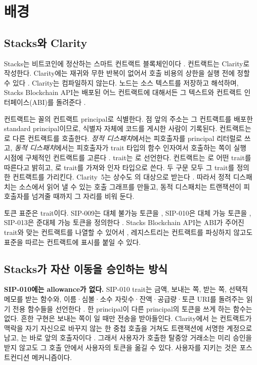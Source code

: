 \section{배경}
\label{sec:background}

\subsection{Stacks와 Clarity}
\label{sec:bg-clarity}

Stacks는 비트코인에 정산하는 스마트 컨트랙트 블록체인이다 \cite{ali2021stacks}. 컨트랙트는 Clarity로 작성한다. Clarity에는 재귀와 무한 반복이 없어서 호출 비용의 상한을 실행 전에 정할 수 있다 \cite{sip002}. Clarity는 컴파일하지 않는다. 노드는 소스 텍스트를 저장하고 해석하며, Stacks Blockchain API는 배포된 어느 컨트랙트에 대해서든 그 텍스트와 컨트랙트 인터페이스(ABI)를 돌려준다 \cite{hiroapi}.

컨트랙트는  꼴의 컨트랙트 principal로 식별한다. 점 앞의 주소는 그 컨트랙트를 배포한 standard principal이므로, 식별자 자체에 코드를 게시한 사람이 기록된다. 컨트랙트는 로 다른 컨트랙트를 호출한다. \emph{정적 디스패치}에서는 피호출자를 principal 리터럴로 쓰고, \emph{동적 디스패치}에서는 피호출자가 trait 타입의 함수 인자여서 호출하는 쪽이 실행 시점에 구체적인 컨트랙트를 고른다 \cite{sip002}. trait는 로 선언한다. 컨트랙트는 로 어떤 trait를 따른다고 밝히고, 로 trait를 가져와 인자 타입으로 쓴다. 두 구문 모두 그 trait를 정의한 컨트랙트를 가리킨다. Clarity~5는 상수도 의 대상으로 받는다 \cite{sip039}. 따라서 정적 디스패치는 소스에서 읽어 낼 수 있는 호출 그래프를 만들고, 동적 디스패치는 트랜잭션이 피호출자를 넘겨줄 때까지 그 자리를 비워 둔다.

토큰 표준은 trait이다. SIP-009는 대체 불가능 토큰을 \cite{sip009}, SIP-010은 대체 가능 토큰을 \cite{sip010}, SIP-013은 준대체 가능 토큰을 정의한다 \cite{sip013}. Stacks Blockchain API는 ABI가 주어진 trait와 맞는 컨트랙트를 나열할 수 있어서 \cite{hiroapi}, 레지스트리는 컨트랙트를 파싱하지 않고도 표준을 따르는 컨트랙트에 표시를 붙일 수 있다.

\subsection{Stacks가 자산 이동을 승인하는 방식}
\label{sec:bg-authorization}

\textbf{SIP-010에는 allowance가 없다.} SIP-010 trait는 금액, 보내는 쪽, 받는 쪽, 선택적 메모를 받는  함수와, 이름·심볼·소수 자릿수·잔액·공급량·토큰 URI를 돌려주는 읽기 전용 함수들을 선언한다 \cite{sip010}. 한 principal이 다른 principal의 토큰을 쓰게 하는 함수는 없다. 흔한 구현은 보내는 쪽이 일 때만 전송을 받아들인다. Clarity에서 는 컨트랙트가 맥락을 자기 자신으로 바꾸지 않는 한 중첩 호출을 거쳐도 트랜잭션에 서명한 계정으로 남고, 는 바로 앞의 호출자이다 \cite{sip002}. 그래서 사용자가 호출한 탈중앙 거래소는 미리 승인을 받지 않고도 그 호출 안에서 사용자의 토큰을 옮길 수 있다. 사용자를 지키는 것은 포스트컨디션 메커니즘이다.

